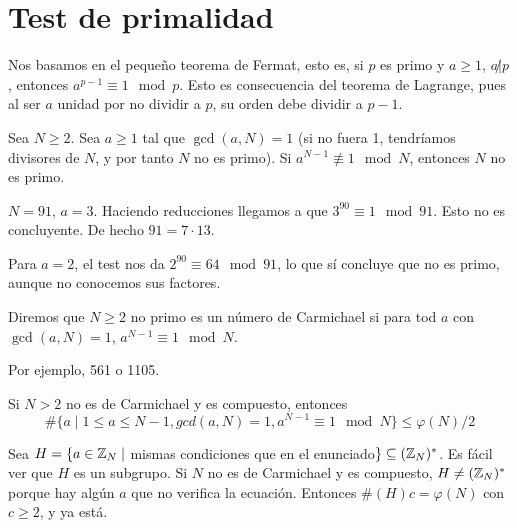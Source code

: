 \documentclass[CR.tex]{subfiles}
\begin{document}
\section{Test de primalidad}
Nos basamos en el pequeño teorema de Fermat, esto es, si $p$ es primo y $a\geq 1$, $a\not| p$, entonces $a^{p-1}\equiv 1\mod p$. Esto es consecuencia del teorema de Lagrange, pues al ser $a$ unidad por no dividir a $p$, su orden debe dividir a $p-1$. 

Sea $N\geq 2$. Sea $a\geq 1$ tal que $\gcd(a,N)=1$ (si no fuera 1, tendríamos divisores de $N$, y por tanto $N$ no es primo). Si $a^{N-1}\not\equiv 1\mod N$, entonces $N$ no es primo.

\begin{ej}
$N=91$, $a=3$. Haciendo reducciones llegamos a que $3^{90}\equiv 1\mod 91$. Esto no es concluyente. De hecho $91=7\cdot 13$. 

Para $a=2$, el test nos da $2^{90}\equiv 64\mod 91$, lo que sí concluye que no es primo, aunque no conocemos sus factores. 
\end{ej}


\begin{defi}
Diremos que $N\geq 2$ no primo es un número de Carmichael si para tod $a$ con $\gcd(a,N)=1$, $a^{N-1}\equiv 1\mod N$.
\end{defi}

Por ejemplo, 561 o 1105. 

\begin{prop}
Si $N>2$ no es de Carmichael y es compuesto, entonces 
\[
\#\{a\mid 1\leq a\leq N-1, gcd(a,N)=1, a^{N-1}\equiv 1\mod N\}\leq \varphi(N)/2 
\]
\end{prop}
\begin{dem}
Sea $H=\{a\in\mathbb{Z}_N\mid$ mismas condiciones que en el enunciado$\}\subseteq (\mathbb{Z}_N)^*$. Es fácil ver que $H$ es un subgrupo. Si $N$ no es de Carmichael y es compuesto, $H\neq (\mathbb{Z}_N)^*$ porque hay algún $a$ que no verifica la ecuación. Entonces $\#(H)c=\varphi(N)$ con $c\geq 2$, y ya está. 
\end{dem}
\end{document}
